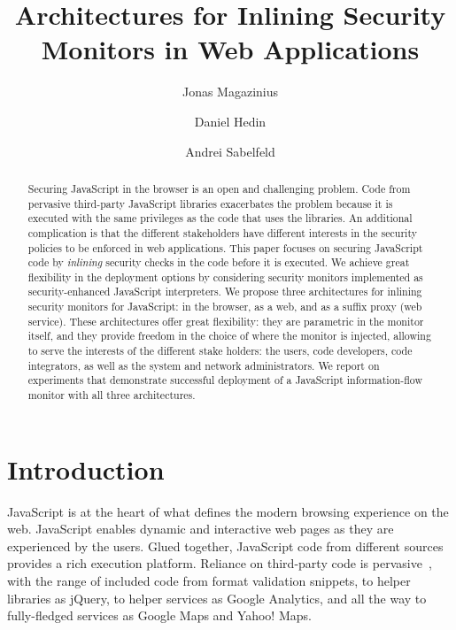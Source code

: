 \documentclass{llncs}
\title{Architectures for Inlining Security Monitors in Web Applications}
\author{Jonas Magazinius \and Daniel Hedin \and Andrei Sabelfeld}
\institute{Chalmers University of Technology, Gothenburg, Sweden}
\begin{document}
\maketitle

\thispagestyle{plain}

\begin{abstract}
Securing JavaScript in the browser is an open and challenging
problem. Code from pervasive third-party JavaScript libraries exacerbates the
problem because it is executed with the same privileges as the code
that uses the libraries.
%
An additional complication is that the different stakeholders have
different interests in the security policies to be enforced
in web applications.
%
This paper focuses on securing JavaScript code by \emph{inlining}
security checks in the code before it is executed.
%
We achieve great flexibility in the deployment options by considering
security monitors implemented as security-enhanced JavaScript interpreters.
%
We propose three architectures for inlining security monitors for JavaScript: in
the browser, as a web, and as a suffix proxy (web service). 
%
These architectures offer great flexibility: they are parametric in the monitor itself,
and they provide freedom in the choice of where the monitor is
injected, allowing to serve the interests of the different stake
holders: the users, code developers, code
integrators, as well as the system and network administrators.
%
We report on experiments that demonstrate successful deployment of a JavaScript
information-flow monitor with all three architectures.
\end{abstract}










\section{Introduction}
\label{sec:intro}
JavaScript is at the heart of what defines the modern
browsing experience on the web. JavaScript enables dynamic and interactive
web pages as they are experienced by the users. Glued together,
JavaScript code from different sources provides
a rich execution platform. Reliance on third-party code is
pervasive~\cite{Nikiforakis+:CCS12}, with the range of included code from
format validation snippets, to helper
libraries as jQuery, to helper services as Google Analytics, and all the way to fully-fledged services as
Google Maps and Yahoo! Maps.
\end{document}
